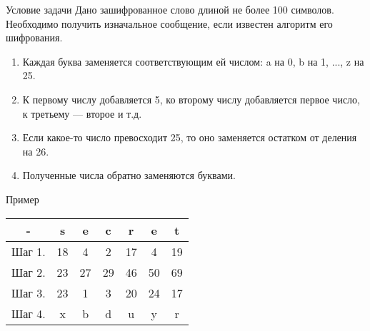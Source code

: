 \documentclass[12pt]{beamer}
\begin{document}
\begin{frame}{Условие задачи}
    Дано зашифрованное слово длиной не более 100 символов. Необходимо получить изначальное сообщение, если известен алгоритм его шифрования.
    \begin{enumerate}
        \item Каждая буква заменяется соответствующим ей числом: a на 0, b на 1, ..., z на 25.
        \item К первому числу добавляется 5, ко второму числу добавляется первое число, к третьему — второе и т.д. 
        \item Если какое-то число превосходит 25, то оно заменяется остатком от деления на 26. 
        \item Полученные числа обратно заменяются буквами.
    \end{enumerate}
    
    
\end{frame}

\begin{frame}{Пример}

\setlength{}
\renewcommand*{\arraystretch}{2}

    \begin{table}
    \centering
    \begin{tabular}{|c|c|c|c|c|c|c|}
        \hline
        - & s & e & c & r & e & t\\
        \hline
        Шаг 1. & 18 & 4 & 2 & 17 & 4 & 19\\
        Шаг 2. & 23 & 27 & 29 & 46 & 50 & 69\\
        Шаг 3. & 23 & 1 & 3 & 20 & 24 & 17\\
        Шаг 4. & x & b & d & u & y & r\\
        \hline
    \end{tabular}
    \end{table}
    
    
\end{frame}
\end{document}

